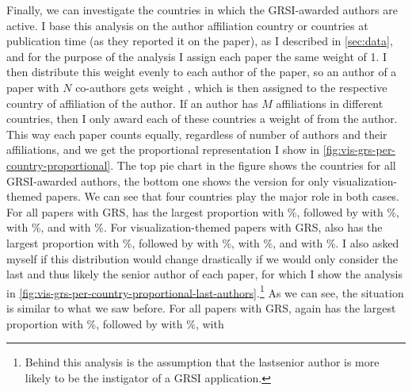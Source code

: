 \documentclass[conference,svgnames]{vgtc}                     %
\begin{document}
Finally, we can investigate the countries in which the GRSI-awarded authors are active. I base this analysis on the author affiliation country or countries at publication time (as they reported it on the paper), as I described in \autoref{sec:data}, and for the purpose of the analysis I assign each paper the same weight of 1. I then distribute this weight evenly to each author of the paper, so an author of a paper with $N$ co-authors gets weight , which is then assigned to the respective country of affiliation of the author. If an author has $M$ affiliations in different countries, then I only award each of these countries a weight of  from the author. This way each paper counts equally, regardless of number of authors and their affiliations, and we get the proportional representation I show in \autoref{fig:vis-grs-per-country-proportional}. The top pie chart in the figure shows the countries for all GRSI-awarded authors, the bottom one shows the version for only visualization-themed papers. We can see that four countries play the major role in both cases. For all papers with GRS, \GrsiCountryPieChartOverallNoOneName{}{} has the largest proportion with \GrsiCountryPieChartOverallNoOnePercentage{}\%, followed by \GrsiCountryPieChartOverallNoTwoName{} with \GrsiCountryPieChartOverallNoTwoPercentage{}\%, \GrsiCountryPieChartOverallNoThreeName{} with \GrsiCountryPieChartOverallNoThreePercentage{}\%, and \GrsiCountryPieChartOverallNoFourName{} with \GrsiCountryPieChartOverallNoFourPercentage{}\%. For visualization-themed papers with GRS, \GrsiCountryPieChartVisNoOneName{} also has the largest proportion with \GrsiCountryPieChartVisNoOnePercentage{}\%, followed by \GrsiCountryPieChartVisNoTwoName{} with \GrsiCountryPieChartVisNoTwoPercentage{}\%, \GrsiCountryPieChartVisNoThreeName{} with \GrsiCountryPieChartVisNoThreePercentage{}\%, and \GrsiCountryPieChartVisNoFourName{} with \GrsiCountryPieChartVisNoFourPercentage{}\%. I also asked myself if this distribution would change drastically if we would only consider the last and thus likely the senior author of each paper, for which I show the analysis in \autoref{fig:vis-grs-per-country-proportional-last-authors}.\footnote{Behind this analysis is the assumption that the last\discretionary{/}{}{/}senior author is more likely to be the instigator of a GRSI application.} As we can see, the situation is similar to what we saw before. For all papers with GRS, \GrsiCountryPieChartOverallSeniorNoOneName{}{} again has the largest proportion with \GrsiCountryPieChartOverallSeniorNoOnePercentage{}\%, followed by \GrsiCountryPieChartOverallSeniorNoTwoName{} with \GrsiCountryPieChartOverallSeniorNoTwoPercentage{}\%, \GrsiCountryPieChartOverallSeniorNoThreeName{} with 
\end{document}

